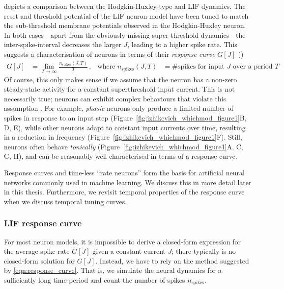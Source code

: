  depicts a comparison between the Hodgkin-Huxley-type and LIF dynamics.
The reset and threshold potential of the LIF neuron model have been tuned to match the sub-threshold membrane potentials observed in the Hodgkin-Huxley neuron.
In both cases---apart from the obviously missing super-threshold dynamics---the inter-spike-interval decreases the larger $J$, leading to a higher spike rate.
This suggests a characterisation of neurons in terms of their \emph{response curve} $G[J]$ ()
\begin{align}
	G[J] &= \lim_{T \to \infty} \frac{n_\mathrm{spikes}(J, T)}{T} \,, & \text{where } n_\mathrm{spikes}(J, T) &= \text{\#spikes for input $J$ over a period $T$} \,.
	\label{eqn:response_curve}
\end{align}
Of course, this only makes sense if we assume that the neuron has a non-zero steady-state activity for a constant superthreshold input current.
This is not necessarily true; neurons can exhibit complex behaviours that violate this assumption \citep{izhikevich2004which}.
For example, \emph{phasic} neurons only produce a limited number of spikes in response to an input step (Figure~\ref{fig:izhikevich_whichmod_figure1}B, D, E), while other neurons adapt to constant input currents over time, resulting in a reduction in frequency (Figure~\ref{fig:izhikevich_whichmod_figure1}F).
Still, neurons often behave \emph{tonically} (Figure~\ref{fig:izhikevich_whichmod_figure1}A, C, G, H), and can be reasonably well characterised in terms of a response curve.

Response curves and time-less \enquote{rate neurons} form the basis for artificial neural networks commonly used in machine learning. We discuss this in more detail later in this thesis.
Furthermore, we revisit temporal properties of the response curve when we discuss temporal tuning curves. %

\subsubsection{LIF response curve}
For most neuron models, it is impossible to derive a closed-form expression for the average spike rate $G[J]$ given a constant current $J$; there typically is no closed-form solution for $G[J]$. 
Instead, we have to rely on the method suggested by \cref{eqn:response_curve}.
That is, we simulate the neural dynamics for a sufficiently long time-period and count the number of spikes $n_\mathrm{spikes}$.

